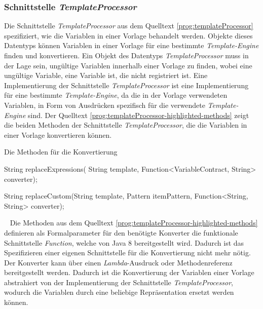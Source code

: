 \subsubsection{Schnittstelle \emph{TemplateProcessor}}
\label{sec:templateProcessor}
Die Schnittstelle \emph{TemplateProcessor} aus dem Quelltext  \ref{prog:templateProcessor} spezifiziert, wie die Variablen in einer Vorlage behandelt werden. Objekte dieses Datentyps können Variablen in einer Vorlage für eine bestimmte \emph{Template-Engine} finden und konvertieren. Ein Objekt des Datentyps \emph{TemplateProcessor} muss in der Lage sein, ungültige Variablen innerhalb einer Vorlage zu finden, wobei eine ungültige Variable, eine Variable ist, die nicht registriert ist. Eine Implementierung der Schnittstelle \emph{TemplateProcessor} ist eine Implementierung für eine bestimmte \emph{Template-Engine}, da die in der Vorlage verwendeten Variablen, in Form von Ausdrücken spezifisch für die verwendete \emph{Template-Engine} sind. 
\newline
\newline
Der Quelltext \ref{prog:templateProcessor-highlighted-methods} zeigt die beiden Methoden der Schnittstelle \emph{TemplateProcessor}, die die Variablen in einer Vorlage konvertieren können.
\newpage

\begin{program}[h]
\caption{Die Methoden für die Konvertierung}
\label{prog:templateProcessor-highlighted-methods}
\begin{JavaCode}[numbers=none]
String replaceExpressions(
                  String template,
                  Function<VariableContract, String> converter);

String replaceCustom(String template,
                     Pattern itemPattern,
                     Function<String, String> converter);
\end{JavaCode}
\end{program}
\ \newline
Die Methoden aus dem Quelltext \ref{prog:templateProcessor-highlighted-methods} definieren als Formalparameter für den benötigte Konverter die funktionale Schnittstelle \emph{Function}, welche von Java 8 bereitgestellt wird. Dadurch ist das Spezifizieren einer eigenen Schnittstelle für die Konvertierung nicht mehr nötig. Der Konverter kann über einen \emph{Lambda}-Ausdruck oder Methodenreferenz bereitgestellt werden. Dadurch ist die Konvertierung der Variablen einer Vorlage abstrahiert von der Implementierung der Schnittstelle \emph{TemplateProcessor}, wodurch die Variablen durch eine beliebige Repräsentation ersetzt werden können.

